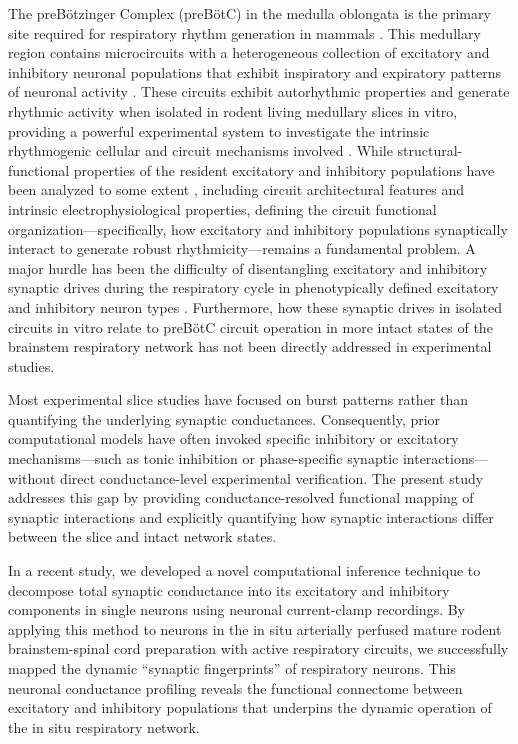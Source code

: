 \documentclass[
]{article}
\begin{document}
The preBötzinger Complex (preBötC) in the medulla oblongata is the primary site required for respiratory rhythm generation in mammals \citep{smith1991prebotzinger}. This medullary region contains microcircuits with a heterogeneous collection of excitatory and inhibitory neuronal populations that exhibit inspiratory and expiratory patterns of neuronal activity \citep[e.g.,][]{schwarzacher1995prebotzinger,ausborn2018organization}. These circuits exhibit autorhythmic properties and generate rhythmic activity when isolated in rodent living medullary slices in vitro, providing a powerful experimental system to investigate the intrinsic rhythmogenic cellular and circuit mechanisms involved \citep[e.g.,][]{butera1999bursting,butera1999coupled,smith2000respiratory,feldman2006looking}. While structural-functional properties of the resident excitatory and inhibitory populations have been analyzed to some extent \citep{koizumi2013structural}, including circuit architectural features and intrinsic electrophysiological properties, defining the circuit functional organization---specifically, how excitatory and inhibitory populations synaptically interact to generate robust rhythmicity---remains a fundamental problem. A major hurdle has been the difficulty of disentangling excitatory and inhibitory synaptic drives during the respiratory cycle in phenotypically defined excitatory and inhibitory neuron types \citep{koizumi2013structural}. Furthermore, how these synaptic drives in isolated circuits in vitro relate to preBötC circuit operation in more intact states of the brainstem respiratory network has not been directly addressed in experimental studies.

Most experimental slice studies have focused on burst patterns rather than quantifying the underlying synaptic conductances. Consequently, prior computational models have often invoked specific inhibitory or excitatory mechanisms---such as tonic inhibition or phase-specific synaptic interactions---without direct conductance-level experimental verification. The present study addresses this gap by providing conductance-resolved functional mapping of synaptic interactions and explicitly quantifying how synaptic interactions differ between the slice and intact network states.

In a recent study, we developed a novel computational inference technique \citep{molkov2024inference} to decompose total synaptic conductance into its excitatory and inhibitory components in single neurons using neuronal current-clamp recordings. By applying this method to neurons in the in situ arterially perfused mature rodent brainstem-spinal cord preparation with active respiratory circuits, we successfully mapped the dynamic ``synaptic fingerprints'' of respiratory neurons. This neuronal conductance profiling reveals the functional connectome between excitatory and inhibitory populations that underpins the dynamic operation of the in situ respiratory network.
\end{document}
